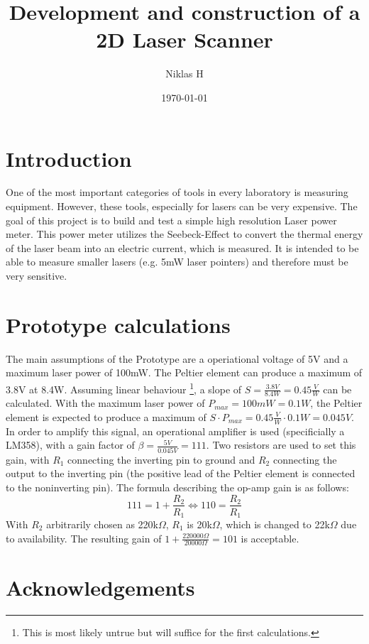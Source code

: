 \documentclass[a4paper, 11pt]{scrartcl}
\title {Development and construction of a 2D Laser Scanner}
\author {Niklas H}
\date {\today}
\begin{document}
\maketitle
\tableofcontents
\newpage
\section{Introduction}
One of the most important categories of tools in every laboratory is measuring equipment. However, these tools, especially for lasers can be very expensive. The goal of this project is to build and test a simple high resolution Laser power meter. This power meter utilizes the Seebeck-Effect to convert the thermal energy of the laser beam into an electric current, which is measured. It is intended to be able to measure smaller lasers (e.g. 5mW laser pointers) and therefore must be very sensitive.
\section{Prototype calculations}
The main assumptions of the Prototype are a operiational voltage of 5V and a maximum laser power of 100mW. The Peltier element can produce a maximum of 3.8V at 8.4W. Assuming linear behaviour \footnote{This is most likely untrue but will suffice for the first calculations.}, a slope of $S = \frac{3.8V}{8.4W}=0.45\frac{V}{W}$ can be calculated. With the maximum laser power of $P_{max}=100mW=0.1W$, the Peltier element is expected to produce a maximum of $S\cdot P_{max} = 0.45\frac{V}{W}\cdot 0.1W = 0.045V$. In order to amplify this signal, an operational amplifier is used (specificially a LM358), with a gain factor of $\beta = \frac{5V}{0.045V} = 111$. Two resistors are used to set this gain, with $R_1$ connecting the inverting pin to ground and $R_2$ connecting the output to the inverting pin (the positive lead of the Peltier element is connected to the noninverting pin). The formula describing the op-amp gain is as follows:
\begin{equation}
111 = 1 + \frac{R_2}{R_1} \Leftrightarrow
110 = \frac{R_2}{R_1}
\end{equation}
With $R_2$ arbitrarily chosen as 220k$\Omega$, $R_1$ is 20k$\Omega$, which is changed to 22k$\Omega$ due to availability. The resulting gain of $1+\frac{220000\Omega}{20000\Omega}=101$ is acceptable. \\
\section{Acknowledgements}


%
\end{document}
